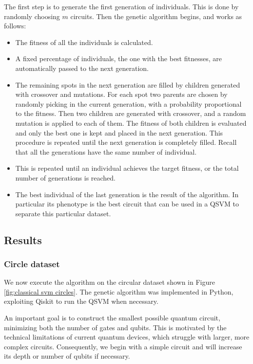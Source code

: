 \documentclass[12pt]{article}
\begin{document}
The first step is to generate the first generation of individuals. This is done by randomly choosing $m$ circuits. Then the genetic algorithm begins, and works as follows:
\begin{itemize}
    \item The fitness of all the individuals is calculated.
    \item A fixed percentage of individuals, the one with the best fitnesses, are automatically passed to the next generation. 
    \item The remaining spots in the next generation are filled by children generated with crossover and mutations. For each spot two parents are chosen by randomly picking in the current generation, with a probability proportional to the fitness. Then two children are generated with crossover, and a random mutation is applied to each of them. The fitness of both children is evaluated and only the best one is kept and placed in the next generation. This procedure is repeated until the next generation is completely filled. Recall that all the generations have the same number of individual.
    \item This is repeated until an individual achieves the target fitness, or the total number of generations is reached.
    \item The best individual of the last generation is the result of the algorithm. In particular its phenotype is the best circuit that can be used in a QSVM to separate this particular dataset. 
\end{itemize}


\subsection{Results}

\subsubsection{Circle dataset}
We now execute the algorithm on the circular dataset shown in Figure \ref{fig:classical svm circles}. The genetic algorithm was implemented in Python, exploiting Qiskit to run the QSVM when necessary.

An important goal is to construct the smallest possible quantum circuit, minimizing both the number of gates and qubits. This is motivated by the technical limitations of current quantum devices, which struggle with larger, more complex circuits. Consequently, we begin with a simple circuit and will increase its depth or number of qubits if necessary.
\end{document}
